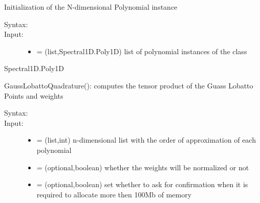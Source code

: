 \documentclass[letterpaper,10pt,english]{sphinxmanual}
\begin{document}
\begin{fulllineitems}
\label{index:SpectralToolbox.SpectralND.PolyND}
Initialization of the N-dimensional Polynomial instance
\begin{description}
\item[{Syntax:}] \leavevmode
{}

\item[{Input:}] \leavevmode\begin{itemize}
\item {} 
 = (list,Spectral1D.Poly1D) list of polynomial instances of the class 

\end{itemize}

\end{description}




Spectral1D.Poly1D



\begin{fulllineitems}
\label{index:SpectralToolbox.SpectralND.PolyND.GaussLobattoQuadrature}
GaussLobattoQuadrature(): computes the tensor product of the Guass Lobatto Points and weights
\begin{description}
\item[{Syntax:}] \leavevmode
{}

\item[{Input:}] \leavevmode\begin{itemize}
\item {} 
 = (list,int) n-dimensional list with the order of approximation of each polynomial

\item {} 
 = (optional,boolean) whether the weights will be normalized or not

\item {} 
 = (optional,boolean) set whether to ask for confirmation when it is required to allocate more then 100Mb of memory

\end{itemize}


\end{description}
\end{fulllineitems}
\end{fulllineitems}
\end{document}
